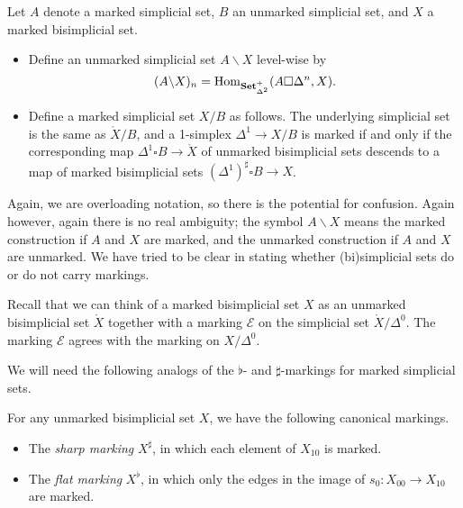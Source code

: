 \documentclass[main.tex]{subfiles}
\begin{document}
\begin{definition}
  Let $A$ denote a marked simplicial set, $B$ an unmarked simplicial set, and $X$ a marked bisimplicial set.
  \begin{itemize}
    \item Define an unmarked simplicial set $A \backslash X$ level-wise by
      \begin{equation*}
        (A \backslash X)_{n} = \mathrm{Hom}_{\mathbf{Set}_{\Delta^{2}}^{+}}(A \square \Delta^{n}, X).
      \end{equation*}

    \item Define a marked simplicial set $X / B$ as follows. The underlying simplicial set is the same as $\mathring{X} / B$, and a 1-simplex $\Delta^{1} \to X / B$ is marked if and only if the corresponding map $\Delta^{1} \square B \to \mathring{X}$ of unmarked bisimplicial sets descends to a map of marked bisimplicial sets $(\Delta^{1})^{\sharp} \square B \to X$.
  \end{itemize}
\end{definition}

Again, we are overloading notation, so there is the potential for confusion. Again however, again there is no real ambiguity; the symbol $A \backslash X$ means the marked construction if $A$ and $X$ are marked, and the unmarked construction if $A$ and $X$ are unmarked. We have tried to be clear in stating whether (bi)simplicial sets do or do not carry markings.

\begin{example}
  Recall that we can think of a marked bisimplicial set $X$ as an unmarked bisimplicial set $\mathring{X}$ together with a marking $\mathcal{E}$ on the simplicial set $\mathring{X} / \Delta^{0}$. The marking $\mathcal{E}$ agrees with the marking on $X / \Delta^{0}$.
\end{example}

We will need the following analogs of the $\flat$- and $\sharp$-markings for marked simplicial sets.

\begin{example}
  For any unmarked bisimplicial set $X$, we have the following canonical markings. 
  \begin{itemize}
    \item The \emph{sharp marking} $X^{\sharp}$, in which each element of $X_{10}$ is marked.

    \item The \emph{flat marking} $X^{\flat}$, in which only the edges in the image of $s_{0}\colon X_{00} \to X_{10}$ are marked.
  \end{itemize}
\end{example}
\end{document}
